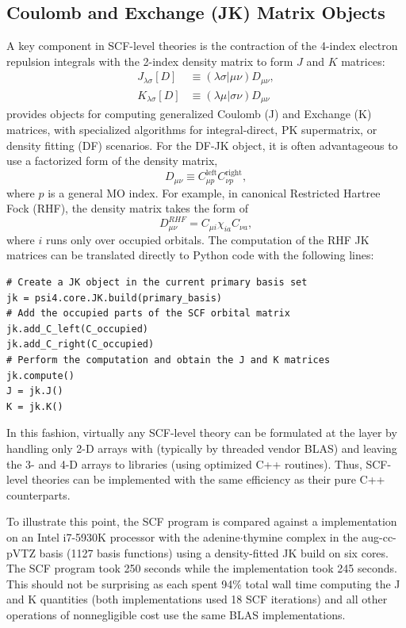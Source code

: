 \documentclass[%
  class = book,%
  crop = false,%
  float = true,%
  multi = true,%
  preview = false,%
]{standalone}
\let\cite\autocite
\begin{document}
\subsection{Coulomb and Exchange (JK) Matrix Objects}

A key component in SCF-level theories is the contraction of the 4-index electron repulsion integrals with the 2-index density matrix to form \(J\) and \(K\) matrices:
\begin{align}
  J_{\lambda \sigma}[D] &\equiv (\lambda\sigma|\mu\nu) D_{\mu\nu}, \\
  K_{\lambda \sigma}[D] &\equiv (\lambda\mu|\sigma\nu) D_{\mu\nu}
\end{align}
\pfour provides objects for computing generalized Coulomb (J) and Exchange (K) matrices, with specialized algorithms for integral-direct, PK supermatrix\cite{20}, or density fitting (DF) scenarios.  For the DF-JK object, it is often advantageous to use a factorized form of the density matrix,
\begin{equation}
  D_{\mu\nu} \equiv C^\text{left}_{\mu p} C^\text{right}_{\nu p},
\end{equation}
where \(p\) is a general MO index. For example, in canonical Restricted Hartree Fock (RHF), the density matrix takes the form of
\begin{equation}
  D^{RHF}_{\mu\nu} = C_{\mu i} \chi_{ia} C_{\nu a},
\end{equation}
where \(i\) runs only over occupied orbitals. The computation of the RHF JK matrices can be translated directly to Python code with the following lines:

\begin{verbatim}
# Create a JK object in the current primary basis set
jk = psi4.core.JK.build(primary_basis)
# Add the occupied parts of the SCF orbital matrix
jk.add_C_left(C_occupied)
jk.add_C_right(C_occupied)
# Perform the computation and obtain the J and K matrices
jk.compute()
J = jk.J()
K = jk.K()
\end{verbatim}
In this fashion, virtually any SCF-level theory can be formulated at the \pfn layer by handling only 2-D arrays with \numpy (typically by threaded vendor BLAS) and leaving the 3- and 4-D arrays to \pfour libraries (using optimized C++ routines).  Thus, SCF-level theories can be implemented with the same efficiency as their pure C++ counterparts.

To illustrate this point, the \pfour SCF program is compared against a \pfn implementation on an Intel i7-5930K processor with the adenine\(\cdot\)thymine complex in the aug-cc-pVTZ basis (1127 basis functions) using a density-fitted JK build on six cores. The \pfour SCF program took 250 seconds while the \pfn implementation took 245 seconds. This should not be surprising as each spent 94\% total wall time computing the J and K quantities (both implementations used 18 SCF iterations) and all other operations of nonnegligible cost use the same BLAS implementations.
\end{document}
